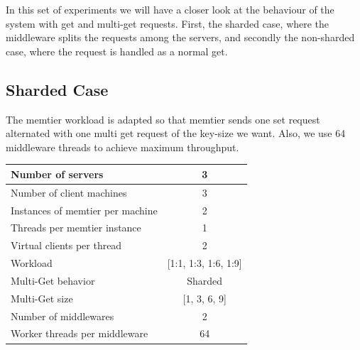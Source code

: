 \documentclass[11pt,a4paper]{article}
\begin{document}
In this set of experiments we will have a closer look at the behaviour of the system with get and multi-get requests. First, the sharded case, where the middleware splits the requests among the servers, and secondly the non-sharded case, where the request is handled as a normal get. 

\subsection{Sharded Case}
The memtier workload is adapted so that memtier sends one set request alternated with one multi get request of the key-size we want. Also, we use 64 middleware threads to achieve maximum throughput. 

\begin{center}
	\scriptsize{
		\begin{tabular}{|l|c|}
			\hline Number of servers                & 3                       \\ 
			\hline Number of client machines        & 3                       \\ 
			\hline Instances of memtier per machine & 2                       \\ 
			\hline Threads per memtier instance     & 1                       \\
			\hline Virtual clients per thread       & 2     		            \\ 
			\hline Workload                         & [1:1, 1:3, 1:6, 1:9]           \\
			\hline Multi-Get behavior               & Sharded                \\
			\hline Multi-Get size                   & [1, 3, 6, 9]                  \\
			\hline Number of middlewares            & 2                       \\
			\hline Worker threads per middleware    & 64 \\
			\hline 
		\end{tabular}
	} 
\end{center}
\end{document}
